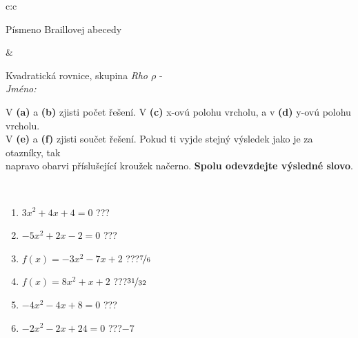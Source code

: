\documentclass[10pt]{report}
\begin{document}
\begin{tabular}{c:c}
\begin{minipage}[c][104.5mm][t]{0.5\linewidth}
\begin{center}
\begin{minipage}{0.20\linewidth}
\begin{center}
{\small Písmeno Braillovej abecedy}
\end{center}
\end{minipage}
\end{center}
\end{minipage}
&
\begin{minipage}[c][104.5mm][t]{0.5\linewidth}
\begin{center}
\vspace{7mm}
{\huge Kvadratická rovnice, skupina \textit{Rho $\rho$} -}\\[5mm]
\textit{Jméno:}\phantom{xxxxxxxxxxxxxxxxxxxxxxxxxxxxxxxxxxxxxxxxxxxxxxxxxxxxxxxxxxxxxxxxx}\\[5mm]
\begin{minipage}{0.95\linewidth}
\begin{center}
V \textbf{(a)} a \textbf{(b)} zjisti počet řešení. V \textbf{(c)} x-ovú polohu vrcholu, a v \textbf{(d)} y-ovú polohu vrcholu.\\V \textbf{(e)} a \textbf{(f)} zjisti součet řešení. Pokud ti vyjde stejný výsledek jako je za otazníky, tak\\napravo obarvi příslušející kroužek načerno. \textbf{Spolu odevzdejte výsledné slovo}.
\end{center}
\end{minipage}
\\[1mm]
\begin{minipage}{0.79\linewidth}
\begin{center}
\begin{varwidth}{\linewidth}
\begin{enumerate}
\Large
\item $3x^2+4x+4=0$\quad \dotfill\; ???\;\dotfill {}
\item $-5x^2+2x-2=0$\quad \dotfill\; ???\;\dotfill {}
\item $f(x)=-3x^2-7x+2$\quad \dotfill\; ???\;\dotfill \quad $\nicefrac{7}{6}$
\item $f(x)=8x^2+x+2$\quad \dotfill\; ???\;\dotfill \quad $\nicefrac{31}{32}$
\item $-4x^2-4x+8=0$\quad \dotfill\; ???\;\dotfill {}
\item $-2x^2-2x+24=0$\quad \dotfill\; ???\;\dotfill \quad $-7$
\end{enumerate}
\end{varwidth}
\end{center}
\end{minipage}
\begin{minipage}{0.20\linewidth}
\begin{center}

\end{center}
\end{minipage}
\end{center}
\end{minipage}
\end{tabular}
\end{document}
